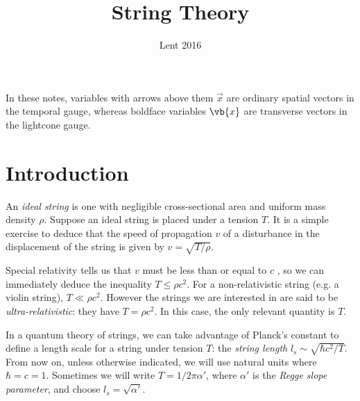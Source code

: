 \documentclass{jknotes}
\begin{document}
\title{String Theory}
\date{Lent 2016}

\maketitle
\suggestionsspiel
In these notes, variables with arrows above them \(\vec{x}\) are ordinary spatial vectors in the temporal gauge, whereas boldface variables \(\vb{x}\) are transverse vectors in the lightcone gauge.

\tableofcontents

\section{Introduction}
An \emph{ideal string} is one with negligible cross-sectional area and uniform mass density \(\rho\). Suppose an ideal string is placed under a tension \(T\). It is a simple exercise to deduce that the speed of propagation \(v\) of a disturbance in the displacement of the string is given by \(v = \sqrt{T/\rho}\).
\begin{figure}[H]
    \centering
\end{figure}
Special relativity tells us that \(v\) must be less than or equal to \(c\) \disapprove, so we can immediately deduce the inequality \(T \le \rho c^2\). For a non-relativistic string (e.g. a violin string), \(T \ll \rho c^2\). However the strings we are interested in are said to be \emph{ultra-relativistic}: they have \(T=\rho c^2\). In this case, the only relevant quantity is \(T\).

In a quantum theory of strings, we can take advantage of Planck's constant to define a length scale for a string under tension \(T\): the \emph{string length} \(l_s \sim \sqrt{\hbar c^2/T}\). From now on, unless otherwise indicated, we will use natural units where \(\hbar=c=1\). Sometimes we will write \(T=1/2\pi\alpha'\), where \(\alpha'\) is the \emph{Regge slope parameter}, and choose \(l_s = \sqrt{\alpha'}\).
\end{document}
